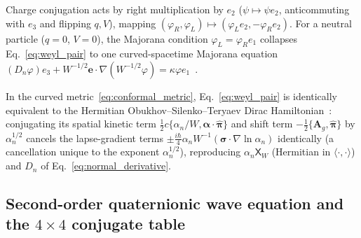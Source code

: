 \documentclass[aps,prd,onecolumn,tightenlines,nofootinbib,notitlepage,10pt,floatfix]{revtex4-2}
\theoremstyle{indentedtheorem}
\begin{document}
Charge conjugation acts by right multiplication by $e_2$ ($\psi\mapsto\psi e_2$, anticommuting with $e_3$ and flipping $q,V$), mapping $(\varphi_R,\varphi_L)\mapsto(\varphi_L e_2,-\varphi_R e_2)$. For a neutral particle ($q=0$, $V=0$), the Majorana condition $\varphi_L=\varphi_R e_1$ collapses Eq.~\eqref{eq:weyl_pair} to one curved-spacetime Majorana equation $(D_n\varphi)e_3+W^{-1/2}\mathbf{e}\cdot\nabla(W^{-1/2}\varphi)=\kappa\varphi e_1$~\citep{Majorana1937Teoria,ArodzSwierczynski2021Majorana}.

In the curved metric~\eqref{eq:conformal_metric}, Eq.~\eqref{eq:weyl_pair} is identically equivalent to the Hermitian Obukhov--Silenko--Teryaev Dirac Hamiltonian~\citep{ObukhovSilenkoTeryaev2011Dirac,ObukhovSilenkoTeryaev2013Spin}: conjugating its spatial kinetic term $\tfrac{1}{2}c\{\alpha_n/W,\boldsymbol{\alpha}\cdot\hat{\boldsymbol{\pi}}\}$ and shift term $-\tfrac{1}{2}\{\mathbf{A}_g,\hat{\boldsymbol{\pi}}\}$ by $\alpha_n^{1/2}$ cancels the lapse-gradient terms $\pm\tfrac{i\hbar}{4}\alpha_n W^{-1}(\boldsymbol{\sigma}\cdot\nabla\ln\alpha_n)$ identically (a cancellation unique to the exponent $\alpha_n^{1/2}$), reproducing $\alpha_n\mathsf{X}_W$ (Hermitian in $\langle\cdot,\cdot\rangle$) and $D_n$ of Eq.~\eqref{eq:normal_derivative}.

\subsection{Second-order quaternionic wave equation and the \texorpdfstring{$4\times 4$}{4x4} conjugate table}
\label{sec:second_order_table}
\end{document}
